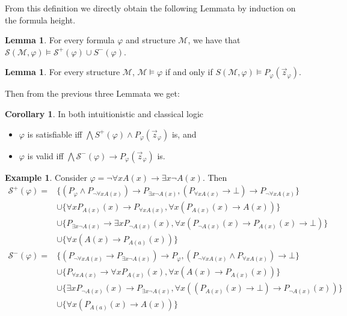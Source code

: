 \documentclass[a4paper,11pt]{report}
\theoremstyle{definition}
\theoremstyle{definition}
\newtheorem{corollary}[theorem]{Corollary}
\theoremstyle{definition}
\newtheorem{lemma}[theorem]{Lemma}
\theoremstyle{definition}
\theoremstyle{definition}
\theoremstyle{definition}
\newtheorem{example}[theorem]{Example}
\theoremstyle{definition}
\begin{document}
	From this definition we directly obtain the following Lemmata by induction on the formula height.
	\begin{lemma}\label{thm:struct1}
		For every formula $\varphi$ and structure $\mathcal M$, we have that $\mathcal S(\mathcal M, \varphi)\models\mathcal S^+(\varphi)\cup S^-(\varphi)$.
	\end{lemma}
	
	\begin{lemma}\label{thm:struct2}
		For every structure $\mathcal M$,
		$\mathcal M\models \varphi$ if and only if $S(\mathcal M, \varphi)\models P_\varphi(\vec z_\varphi)$.
	\end{lemma}
	
	Then from the previous three Lemmata we get:
	
	\begin{corollary}\label{equivalid}
		In both intuitionistic and classical logic
		\begin{itemize}
			\item $\varphi$ is satisfiable iff $\mathcal \bigwedge S^+(\varphi)\wedge P_\varphi(\vec z_\varphi)$ is, and
			\item $\varphi$ is valid iff $\bigwedge\mathcal S^-(\varphi)\to P_\varphi(\vec z_\varphi)$ is.
		\end{itemize}
	\end{corollary}

	\begin{example}
		Consider $\varphi = \neg\forall x A(x)\to \exists x\neg A(x)$. Then
		\begin{align*}
			\mathcal S^+(\varphi) = &\{(P_\varphi\wedge P_{\neg\forall x A(x)})\to P_{\exists x\neg A(x)}, (P_{\forall xA(x)}\to\bot)\to P_{\neg \forall xA(x)}\}\\&\cup\{\forall xP_{A(x)}(x)\to P_{\forall xA(x)}, \forall x(P_{A(x)}(x)\to A(x))\}\\&\cup\{P_{\exists x\neg A(x)}\to \exists xP_{\neg A(x)}(x), \forall x(P_{\neg A(x)}(x)\to P_{A(x)}(x)\to \bot)\}\\&\cup\{\forall x(A(x)\to P_{A(a)}(x))\}\\
			\mathcal S^-(\varphi) = &\{(P_{\neg\forall x A(x)}\to P_{\exists x\neg A(x)})\to P_\varphi,  (P_{\neg \forall xA(x)}\wedge P_{\forall xA(x)})\to\bot\}\\&\cup\{P_{\forall xA(x)}\to \forall xP_{A(x)}(x), \forall x(A(x)\to P_{A(x)}(x))\}\\&\cup\{\exists xP_{\neg A(x)}(x)\to P_{\exists x\neg A(x)}, \forall x((P_{A(x)}(x)\to \bot)\to P_{\neg A(x)}(x))\}\\&\cup\{\forall x(P_{A(a)}(x)\to A(x))\}
		\end{align*}
	\end{example}
\end{document}

